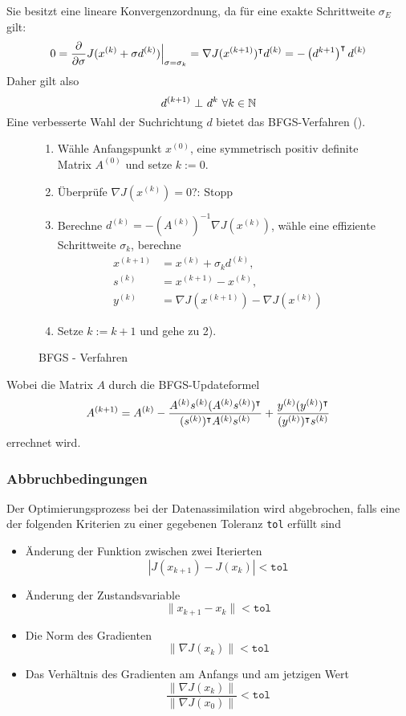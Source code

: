 Sie besitzt eine lineare Konvergenzordnung, da für eine exakte Schrittweite $\sigma_E$ gilt:
\[
 0 = \frac{\partial }{\partial \sigma} J(x^{(k)} + \sigma d^{(k)}) \Big|_{\sigma = \sigma_k} = \nabla J(x^{(k+1)})^\intercal d^{(k)} = - \left( d^{k+1}\right)^\intercal d^{(k)}
\]
Daher gilt also
\[
 d^{(k+1)}~\bot ~d^{k} ~ \forall k \in \mathbb{N}
\]
Eine verbesserte Wahl der Suchrichtung $d$ bietet das BFGS-Verfahren (\cite[Verfahren 4.8.11]{alt2002nichtlineare}).
\begin{figure}[H]
\begin{framed}
\begin{enumerate}
 \item Wähle Anfangspunkt $x^{(0)}$, eine symmetrisch positiv definite Matrix $A^{(0)}$ und setze $k:=0$.
 \item Überprüfe $\nabla J(x^{(k)}) = 0$?: Stopp
 \item Berechne $d^{(k)} = -\left( A^{(k)} \right)^{-1} \nabla J(x^{(k)})$, wähle eine effiziente Schrittweite $\sigma_k$, berechne 
 \[
 \begin{aligned}
  x^{(k+1)} &= x^{(k)} + \sigma_k d^{(k)}, \\ s^{(k)} &= x^{(k+1)} - x^{(k)},\\ y^{(k)} &= \nabla J(x^{(k+1)})- \nabla J(x^{(k)})
 \end{aligned}
 \]
 \item Setze $k:= k+1$ und gehe zu 2).
\end{enumerate} 
\end{framed}
 \caption{BFGS - Verfahren}
 \label{alg:bfgs}
\end{figure}
Wobei die Matrix $A$ durch die BFGS-Updateformel 
\[
 A^{(k+1)} = A^{(k)} - \frac{A^{(k)}s^{(k)}(A^{(k)}s^{(k)})^\intercal}{(s^{(k)})^\intercal A^{(k)}s^{(k)}} + \frac{y^{(k)} (y^{(k)})^\intercal}{(y^{(k)})^\intercal s^{(k)}}
\]
errechnet wird.
\subsubsection{Abbruchbedingungen}
Der Optimierungsprozess bei der Datenassimilation wird abgebrochen, falls eine der folgenden Kriterien zu einer gegebenen Toleranz \texttt{tol} erfüllt sind
\begin{itemize}
 \item Änderung der Funktion zwischen zwei Iterierten
 \[
  |J(x_{k+1}) - J(x_{k})| < \texttt{tol}
 \]
\item Änderung der Zustandsvariable
\[
 \|x_{k+1} - x_{k}\|<\texttt{tol}
\]
\item Die Norm des Gradienten
\[
 \|\nabla J(x_k)\|<\texttt{tol}
\]
\item Das Verhältnis des Gradienten am Anfangs und am jetzigen Wert
\[
 \frac{\|\nabla J(x_k)\| }{\|\nabla J(x_0)\|}<\texttt{tol}
\]


\end{itemize}


